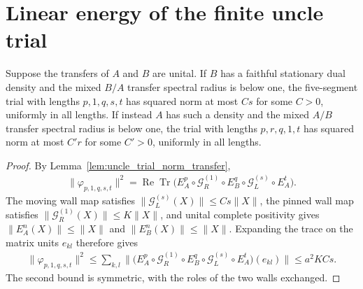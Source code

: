 \section{Linear energy of the finite uncle trial}
\label{sec:uncle_pinned_trial_linear_norm}

\begin{lemma}
    \label{lem:uncle_pinned_trial_linear_norm}
    \leanok
    Suppose the transfers of $A$ and $B$ are unital. If $B$ has a faithful
    stationary dual density and the mixed $B/A$ transfer spectral radius
    is below one, the five-segment trial with lengths $p,1,q,s,t$
    has squared norm at most $Cs$ for some $C>0$, uniformly in all lengths.
    If instead $A$ has such a density and the mixed $A/B$ transfer spectral
    radius is below one, the trial with lengths $p,r,q,1,t$ has squared
    norm at most $C'r$ for some $C'>0$, uniformly in all lengths.
\end{lemma}
\begin{proof}
    \leanok
    By Lemma~\ref{lem:uncle_trial_norm_transfer},
    \begin{align}
        \|\varphi_{p,1,q,s,t}\|^2
        =\operatorname{Re}\operatorname{Tr}\bigl(E_A^p\circ\mathcal G_R^{(1)}
        \circ E_B^q\circ\mathcal G_L^{(s)}\circ E_A^t\bigr).
        \label{eq:uncle_pinned_trial_norm_trace}
    \end{align}
    The moving wall map satisfies $\|\mathcal G_L^{(s)}(X)\|\le Cs\|X\|$,
    the pinned wall map satisfies $\|\mathcal G_R^{(1)}(X)\|\le K\|X\|$,
    and unital complete positivity gives $\|E_A^n(X)\|\le\|X\|$ and
    $\|E_B^n(X)\|\le\|X\|$. Expanding the trace on the matrix units
    $e_{kl}$ therefore gives
    \begin{align}
        \|\varphi_{p,1,q,s,t}\|^2
        \le\sum_{k,l}\bigl\|\bigl(E_A^p\circ\mathcal G_R^{(1)}
        \circ E_B^q\circ\mathcal G_L^{(s)}\circ E_A^t\bigr)(e_{kl})\bigr\|
        \le a^2KCs.
        \label{eq:uncle_pinned_trial_norm_bound}
    \end{align}
    The second bound is symmetric, with the roles of the two walls exchanged.
\end{proof}

